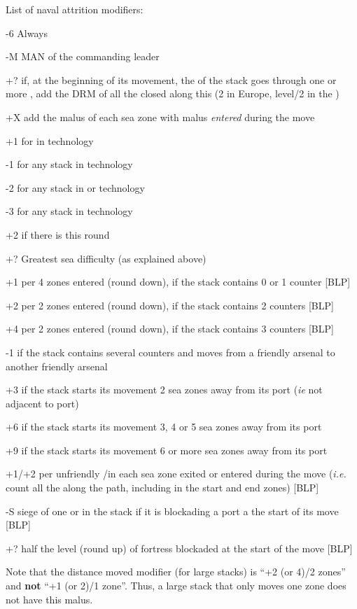 List of naval attrition modifiers:
\begin{modlist}
\item[-6] Always
\item[-M] MAN of the commanding leader
\item[+?] if, at the beginning of its movement, the \LoS of the stack goes
  through one or more \StraitFort, add the DRM of all the closed \StraitFort
  along this \LoS (2 in Europe, level/2 in the \ROTW)
\item[+X] add the malus of each sea zone with malus \emph{entered} during the
  move
\item[+1] for \NWD in \TCAR technology
\item[-1] for any stack in \TBAT technology
\item[-2] for any stack in \TVE or \TTD technology
\item[-3] for any stack in \TSF technology
\item[+2] if there is  this round
\item[+?] Greatest sea difficulty (as explained above)
\item[+1] per 4 zones entered (round down), if the stack contains 0 or 1
  \FLEET counter [BLP]
\item[+2] per 2 zones entered (round down), if the stack contains 2 \FLEET
  counters [BLP]
\item[+4] per 2 zones entered (round down), if the stack contains 3 \FLEET
  counters [BLP]
\item[-1] if the stack contains several \FLEET counters and moves from a
  friendly arsenal to another friendly arsenal
\item[+3] if the stack starts its movement 2 sea zones away from its port
  (\emph{ie} not adjacent to port)
\item[+6] if the stack starts its movement 3, 4 or 5 sea zones away from its
  port
\item[+9] if the stack starts its movement 6 or more sea zones away from its
  port
\item[+1/+2] per unfriendly \corsaire\Facemoins/\Faceplus in each sea zone
  exited or entered during the move (\emph{i.e.} count all the \corsaire along
  the path, including in the start and end zones) [BLP]
\item[-S] siege of one \LeaderA or \LeaderE in the stack if it is blockading a
  port a the start of its move [BLP]
\item[+?] half the level (round up) of fortress blockaded at the start of the
  move [BLP]
\end{modlist}
Note that the distance moved modifier (for large stacks) is ``+2 (or 4)/2
zones'' and \textbf{not} ``+1 (or 2)/1 zone''. Thus, a large stack that only
moves one zone does not have this malus.

